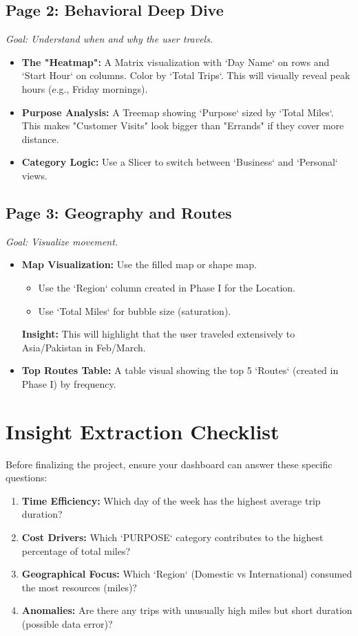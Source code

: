 \subsection{Page 2: Behavioral Deep Dive}
\textit{Goal: Understand when and why the user travels.}
\begin{itemize}
    \item \textbf{The "Heatmap":} A Matrix visualization with `Day Name` on rows and `Start Hour` on columns. Color by `Total Trips`. This will visually reveal peak hours (e.g., Friday mornings).
    \item \textbf{Purpose Analysis:} A Treemap showing `Purpose` sized by `Total Miles`. This makes "Customer Visits" look bigger than "Errands" if they cover more distance.
    \item \textbf{Category Logic:} Use a Slicer to switch between `Business` and `Personal` views.
\end{itemize}

\subsection{Page 3: Geography and Routes}
\textit{Goal: Visualize movement.}
\begin{itemize}
    \item \textbf{Map Visualization:} Use the filled map or shape map. 
    \begin{itemize}
        \item Use the `Region` column created in Phase I for the Location.
        \item Use `Total Miles` for bubble size (saturation).
    \end{itemize}
    \textbf{Insight:} This will highlight that the user traveled extensively to Asia/Pakistan in Feb/March.
    \item \textbf{Top Routes Table:} A table visual showing the top 5 `Routes` (created in Phase I) by frequency.
\end{itemize}

\section{Insight Extraction Checklist}
Before finalizing the project, ensure your dashboard can answer these specific questions:

\begin{enumerate}
    \item \textbf{Time Efficiency:} Which day of the week has the highest average trip duration?
    \item \textbf{Cost Drivers:} Which `PURPOSE` category contributes to the highest percentage of total miles?
    \item \textbf{Geographical Focus:} Which `Region` (Domestic vs International) consumed the most resources (miles)?
    \item \textbf{Anomalies:} Are there any trips with unusually high miles but short duration (possible data error)?
\end{enumerate}

